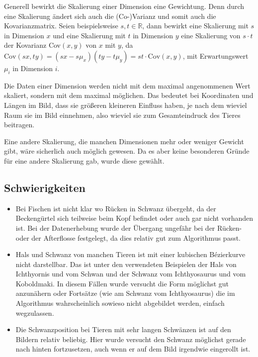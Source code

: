  Generell bewirkt die Skalierung einer Dimension eine Gewichtung. Denn durch eine Skalierung ändert sich auch die (Co-)Varianz und somit auch die Kovarianzmatrix. Seien beispielsweise $s,t \in \mathbb{R}$, dann bewirkt eine Skalierung mit $s$ in Dimension $x$ und eine Skalierung mit $t$ in Dimension $y$ eine Skalierung von $s \cdot t$ der Kovarianz Cov$(x,y)$ von $x$ mit $y$, da $\mathrm{Cov}(sx, ty) = (sx - s\mu_x) (ty - t\mu_y) = st \cdot \mathrm{Cov}(x,y)$, mit Erwartungswert $\mu_i$ in Dimension $i$.
 
 Die Daten einer Dimension werden nicht mit dem maximal angenommenen Wert skaliert, sondern mit dem maximal möglichen. Das bedeutet bei Koordinaten und Längen im Bild, dass sie größeren \bzw kleineren Einfluss haben, je nach dem wieviel Raum sie im Bild einnehmen, also wieviel sie zum Gesamteindruck des Tieres beitragen.
 
 Eine andere Skalierung, die manchen Dimensionen mehr oder weniger Gewicht gibt, wäre sicherlich auch möglich gewesen. Da es aber keine besonderen Gründe für eine andere Skalierung gab, wurde diese gewählt.
 
 \subsection{Schwierigkeiten}
 
 \begin{itemize}
  \item Bei Fischen ist nicht klar wo Rücken in Schwanz übergeht, da der Beckengürtel sich teilweise beim Kopf befindet oder auch gar nicht vorhanden ist. Bei der Datenerhebung wurde der Übergang ungefähr bei der Rücken- oder der Afterflosse festgelegt, da dies relativ gut zum Algorithmus passt.
  
  \item Hals und Schwanz von manchen Tieren ist mit einer kubischen Bézierkurve nicht darstellbar. Das ist unter den verwendeten Beispielen der Hals von Ichthyornis und vom Schwan und der Schwanz vom Ichthyosaurus und vom Koboldmaki. In diesem Fällen wurde versucht die Form möglichst gut anzunähern oder Fortsätze (wie am Schwanz vom Ichthyosaurus) die im Algorithmus wahrscheinlich sowieso nicht abgebildet werden, einfach wegzulassen.
  
  \item Die Schwanzposition bei Tieren mit sehr langen Schwänzen ist auf den Bildern relativ beliebig. Hier wurde versucht den Schwanz möglichst gerade nach hinten fortzusetzen, auch wenn er auf dem Bild irgendwie eingerollt ist.
  
 \end{itemize}
 
